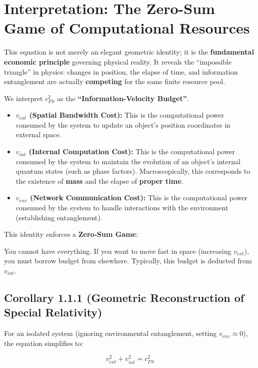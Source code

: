 \section{Interpretation: The Zero-Sum Game of Computational Resources}

This equation is not merely an elegant geometric identity; it is the \textbf{fundamental economic principle} governing physical reality. It reveals the ``impossible triangle'' in physics: changes in position, the elapse of time, and information entanglement are actually \textbf{competing} for the same finite resource pool.

We interpret \textbf{$c_{FS}^2$} as the \textbf{``Information-Velocity Budget''}.

\begin{itemize}
\item \textbf{$v_{ext}$ (Spatial Bandwidth Cost):} This is the computational power consumed by the system to update an object's position coordinates in external space.

\item \textbf{$v_{int}$ (Internal Computation Cost):} This is the computational power consumed by the system to maintain the evolution of an object's internal quantum states (such as phase factors). Macroscopically, this corresponds to the existence of \textbf{mass} and the elapse of \textbf{proper time}.

\item \textbf{$v_{env}$ (Network Communication Cost):} This is the computational power consumed by the system to handle interactions with the environment (establishing entanglement).
\end{itemize}

This identity enforces a \textbf{Zero-Sum Game}:

You cannot have everything. If you want to move fast in space (increasing \textbf{$v_{ext}$}), you must borrow budget from elsewhere. Typically, this budget is deducted from \textbf{$v_{int}$}.

\subsection{Corollary 1.1.1 (Geometric Reconstruction of Special Relativity)}

For an isolated system (ignoring environmental entanglement, setting \textbf{$v_{env} \approx 0$}), the equation simplifies to:

$$v_{ext}^2 + v_{int}^2 = c_{FS}^2$$

